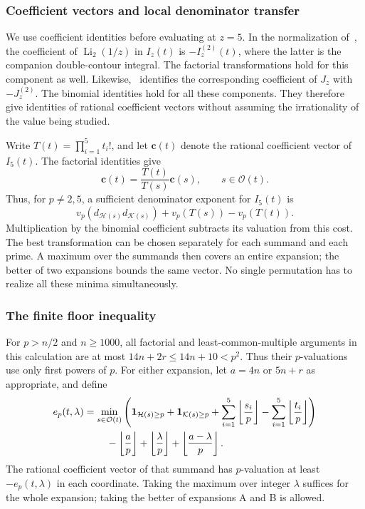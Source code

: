 \documentclass[11pt]{amsart}
\newcommand{\Li}{\operatorname{Li}}
\newcommand{\ind}{\mathbf 1}
\theoremstyle{plain}
\theoremstyle{remark}\newtheorem{remark}[theorem]{Remark}
\numberwithin{equation}{section}
\begin{document}
\subsubsection{Coefficient vectors and local denominator transfer}
We use coefficient identities before evaluating at $z=5$. In the
normalization of~\cite[Theorem 2.1]{RV05}, the coefficient of
$\Li_2(1/z)$ in $I_z(t)$ is $-I_z^{(2)}(t)$, where the latter is
the companion double-contour integral. The factorial transformations
hold for this component as well. Likewise,~\cite[(2.3)]{VZ18} identifies
the corresponding coefficient of $J_z$ with $-J_z^{(2)}$.
The binomial identities hold for all these components. They therefore
give identities of rational coefficient vectors without assuming the
irrationality of the value being studied.

Write $T(t)=\prod_{i=1}^5 t_i!$, and let $\boldsymbol c(t)$ denote
the rational coefficient vector of $I_5(t)$. The factorial identities give
\begin{equation}\label{f:eq:coefficient-transfer}
 \boldsymbol c(t)=\frac{T(t)}{T(s)}\boldsymbol c(s),
 \qquad s\in\mathcal O(t).
\end{equation}
Thus, for $p\ne2,5$, a sufficient denominator exponent for $I_5(t)$ is
\[
 v_p(d_{\mathcal H(s)}d_{\mathcal K(s)})+v_p(T(s))-v_p(T(t)).
\]
Multiplication by the binomial coefficient subtracts its valuation from
this cost. The best transformation can be chosen separately for each
summand and each prime. A maximum over the summands then covers an
entire expansion; the better of two expansions bounds the same vector.
No single permutation has to realize all these minima simultaneously.

\subsubsection{The finite floor inequality}
For $p>n/2$ and $n\geq1000$, all factorial and least-common-multiple arguments in this calculation are at most $14n+2r\le14n+10<p^2$. Thus their $p$-valuations use only first powers of $p$.
For either expansion, let $a=4n$ or $5n+r$ as appropriate, and define
\begin{align}\label{f:eq:ep}
 e_p(t,\lambda)
 &=\min_{s\in\mathcal O(t)}\left(
 \ind_{\mathcal H(s)\geq p}+\ind_{\mathcal K(s)\geq p}
 +\sum_{i=1}^5\left\lfloor\frac{s_i}{p}\right\rfloor
 -\sum_{i=1}^5\left\lfloor\frac{t_i}{p}\right\rfloor\right)\notag\\
 &\hspace{8mm}-\left\lfloor\frac ap\right\rfloor
 +\left\lfloor\frac\lambda p\right\rfloor
 +\left\lfloor\frac{a-\lambda}{p}\right\rfloor.
\end{align}
The rational coefficient vector of that summand has $p$-valuation at least $-e_p(t,\lambda)$ in each coordinate. Taking the maximum over integer $\lambda$ suffices for the whole expansion; taking the better of expansions A and B is allowed.
\end{document}
